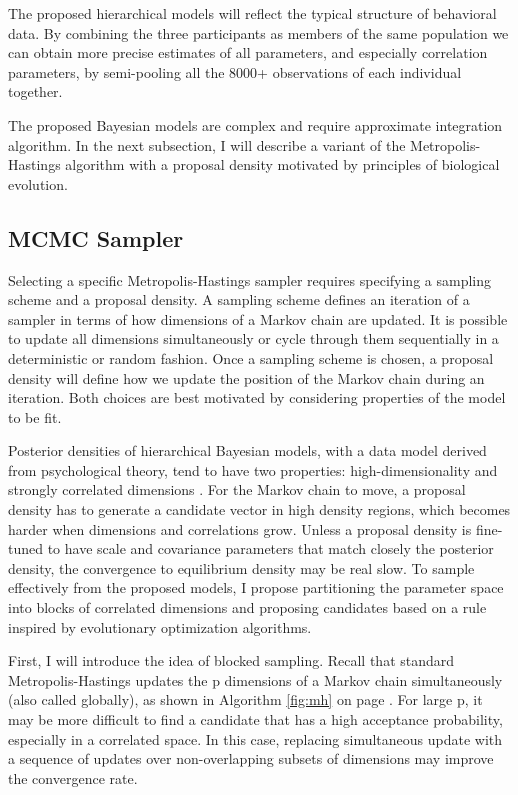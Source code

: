 \documentclass[12pt]{report}
\begin{document}
The proposed hierarchical models will reflect the typical structure of behavioral data. By combining the three participants as members of the same population we can obtain more precise estimates of all parameters, and especially correlation parameters, by semi-pooling all the 8000+ observations of each individual together.

The proposed Bayesian models are complex and require approximate integration algorithm. In the next subsection, I will describe a variant of the Metropolis-Hastings algorithm with a proposal density motivated by principles of biological evolution.

\subsection{MCMC Sampler}
Selecting a specific Metropolis-Hastings sampler requires specifying a sampling scheme and a proposal density. A sampling scheme defines an iteration of a sampler in terms of how dimensions of a Markov chain are updated. It is possible to update all dimensions simultaneously or cycle through them sequentially in a deterministic or random fashion. Once a sampling scheme is chosen, a proposal density will define how we update the position of the Markov chain during an iteration. Both choices are best motivated by considering properties of the model to be fit.  

Posterior densities of hierarchical Bayesian models, with a data model derived from psychological theory, tend to have two properties: high-dimensionality and strongly correlated dimensions \citep{GelCar2013,RatTue2002,TurSed2013}. For the Markov chain to move, a proposal density has to generate a candidate vector in high density regions, which becomes harder when dimensions and correlations grow. Unless a proposal density is fine-tuned to have scale and covariance parameters that match closely the posterior density, the convergence to equilibrium density may be real slow. To sample effectively from the proposed models, I propose partitioning the parameter space into blocks of correlated dimensions and proposing candidates based on a rule inspired by evolutionary optimization algorithms.  

First, I will introduce the idea of blocked sampling. Recall that standard Metropolis-Hastings updates the p dimensions of a Markov chain simultaneously (also called globally), as shown in Algorithm \ref{fig:mh} on page \pageref{fig:mh}. For large p, it may be more difficult to find a candidate that has a high acceptance probability, especially in a correlated space. In this case, replacing simultaneous update with a sequence of updates over non-overlapping subsets of dimensions may improve the convergence rate. 
\end{document}
